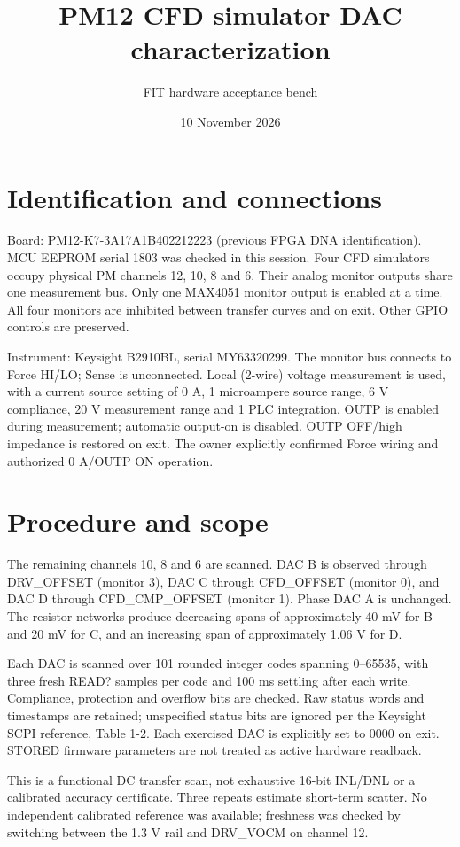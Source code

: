 \documentclass[a4paper,11pt]{article}
\begin{document}
\title{PM12 CFD simulator DAC characterization}
\author{FIT hardware acceptance bench}
\date{10 November 2026}\maketitle
\section{Identification and connections}
Board: PM12-K7-3A17A1B402212223 (previous FPGA DNA identification).
MCU EEPROM serial 1803 was checked in this session.
Four CFD simulators occupy physical PM channels 12, 10, 8 and 6.
Their analog monitor outputs share one measurement bus. Only one MAX4051
monitor output is enabled at a time. All four monitors are inhibited between
transfer curves and on exit. Other GPIO controls are preserved.

Instrument: Keysight B2910BL, serial MY63320299. The monitor bus connects to
Force HI/LO; Sense is unconnected. Local (2-wire) voltage measurement is used,
with a current source setting of 0 A, 1 microampere source range,
6 V compliance, 20 V measurement range and 1 PLC integration.
OUTP is enabled during measurement; automatic output-on is disabled.
OUTP OFF/high impedance is restored on exit. The owner explicitly confirmed
Force wiring and authorized 0 A/OUTP ON operation.
\section{Procedure and scope}
The remaining channels 10, 8 and 6 are scanned. DAC B is observed through
DRV\_OFFSET (monitor 3), DAC C through CFD\_OFFSET (monitor 0), and DAC D
through CFD\_CMP\_OFFSET (monitor 1). Phase DAC A is unchanged.
The resistor networks produce decreasing spans of approximately 40 mV for B
and 20 mV for C, and an increasing span of approximately 1.06 V for D.

Each DAC is scanned over 101 rounded integer codes spanning 0--65535, with
three fresh READ? samples per code and 100 ms settling after each write.
Compliance, protection and overflow bits are checked. Raw status words and
timestamps are retained; unspecified status bits are ignored per the Keysight
SCPI reference, Table 1-2. Each exercised DAC is explicitly set to 0000 on exit.
STORED firmware parameters are not treated as active hardware readback.

This is a functional DC transfer scan, not exhaustive 16-bit INL/DNL or a
calibrated accuracy certificate. Three repeats estimate short-term scatter.
No independent calibrated reference was available; freshness was checked by
switching between the 1.3 V rail and DRV\_VOCM on channel 12.
\end{document}
